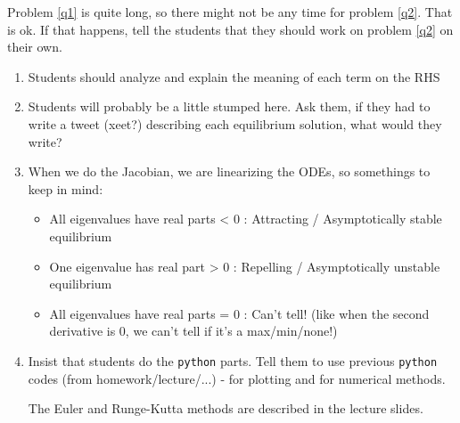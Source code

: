 Problem \ref{q1} is quite long, so there might not be any time for problem \ref{q2}. That is ok. If that happens, tell the students that they should work on problem \ref{q2} on their own.


\begin{enumerate}[label=\ref{q1}.(\alph*)]
	\item Students should analyze and explain the meaning of each term on the RHS
	\item Students will probably be a little stumped here. Ask them, if they had to write a tweet (xeet?) describing each equilibrium solution, what would they write?
	\item When we do the Jacobian, we are linearizing the ODEs, so somethings to keep in mind:
	\begin{itemize}
		\item All eigenvalues have real parts < 0 : Attracting / Asymptotically stable equilibrium
		\item One eigenvalue has real part > 0 : Repelling / Asymptotically unstable equilibrium
		\item All eigenvalues have real parts = 0 : Can't tell! (like when the second derivative is 0, we can't tell if it's a max/min/none!)
	\end{itemize}

	
	\item Insist that students do the \verb|python| parts. Tell them to use previous \verb|python| codes (from homework/lecture/...) - for plotting and for numerical methods.
	
	The Euler and Runge-Kutta methods are described in the lecture slides.
	
\end{enumerate}







%
	
	

	
	
